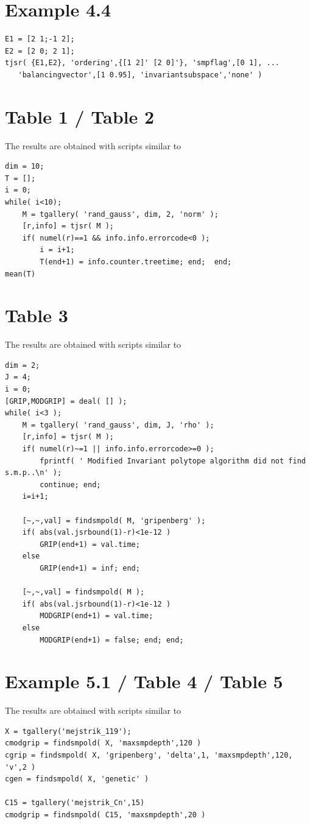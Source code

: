 \section{Example 4.4}
{\small%
\begin{lstlisting}
E1 = [2 1;-1 2];
E2 = [2 0; 2 1];
tjsr( {E1,E2}, 'ordering',{[1 2]' [2 0]'}, 'smpflag',[0 1], ...
   'balancingvector',[1 0.95], 'invariantsubspace','none' )
\end{lstlisting}%
}

\section{Table 1 / Table 2}
The results are obtained with scripts similar to
{\small%
\begin{lstlisting}
dim = 10;
T = [];
i = 0;
while( i<10);
    M = tgallery( 'rand_gauss', dim, 2, 'norm' );
    [r,info] = tjsr( M );
    if( numel(r)==1 && info.info.errorcode<0 );
        i = i+1; 
        T(end+1) = info.counter.treetime; end;  end;
mean(T)
\end{lstlisting}%
}


\section{Table 3}
The results are obtained with scripts similar to
{\small%
\begin{lstlisting}
dim = 2;
J = 4;
i = 0;
[GRIP,MODGRIP] = deal( [] );
while( i<3 );
    M = tgallery( 'rand_gauss', dim, J, 'rho' );
    [r,info] = tjsr( M );
    if( numel(r)~=1 || info.info.errorcode>=0 );
        fprintf( ' Modified Invariant polytope algorithm did not find s.m.p..\n' );
        continue; end;
    i=i+1;
    
    [~,~,val] = findsmpold( M, 'gripenberg' );
    if( abs(val.jsrbound(1)-r)<1e-12 )
        GRIP(end+1) = val.time;
    else
        GRIP(end+1) = inf; end;
    
    [~,~,val] = findsmpold( M );
    if( abs(val.jsrbound(1)-r)<1e-12 )
        MODGRIP(end+1) = val.time;
    else
        MODGRIP(end+1) = false; end; end;
\end{lstlisting}%
}

\section{Example 5.1 / Table 4 / Table 5}
The results are obtained with scripts similar to
{\small%
\begin{lstlisting}
X = tgallery('mejstrik_119');
cmodgrip = findsmpold( X, 'maxsmpdepth',120 )
cgrip = findsmpold( X, 'gripenberg', 'delta',1, 'maxsmpdepth',120, 'v',2 )
cgen = findsmpold( X, 'genetic' )

C15 = tgallery('mejstrik_Cn',15)
cmodgrip = findsmpold( C15, 'maxsmpdepth',20 )
\end{lstlisting}%
}

